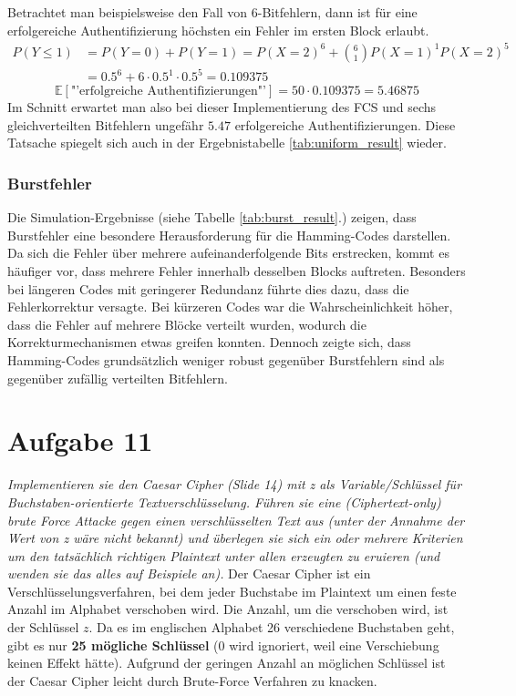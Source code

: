 \documentclass{article}
\begin{document}
    Betrachtet man beispielsweise den Fall von 6-Bitfehlern, dann ist für eine erfolgereiche Authentifizierung
    höchsten ein Fehler im ersten Block erlaubt.
    \begin{align*}
        P(Y \leq 1) &= P(Y = 0) + P(Y = 1) = P(X=2)^{6} + {6\choose 1}P(X=1)^1P(X=2)^{5}\\
        &=0.5^{6} + 6\cdot 0.5^1 \cdot 0.5^5 = 0.109375
    \end{align*}
    \[
        \mathbb{E}\left[\text{"'erfolgreiche Authentifizierungen"'}\right] =  50 \cdot 0.109375 = 5.46875
    \]
    Im Schnitt erwartet man also bei dieser Implementierung des FCS und sechs gleichverteilten Bitfehlern 
    ungefähr $5.47$ erfolgereiche Authentifizierungen. Diese Tatsache spiegelt sich auch in der Ergebnistabelle 
    \ref{tab:uniform_result} wieder.

    
    \subsubsection{Burstfehler}  
    Die Simulation-Ergebnisse (siehe Tabelle \ref{tab:burst_result}.) zeigen, dass Burstfehler eine besondere Herausforderung für die Hamming-Codes darstellen. 
    Da sich die Fehler über mehrere aufeinanderfolgende Bits erstrecken, kommt es häufiger vor, dass mehrere Fehler 
    innerhalb desselben Blocks auftreten. Besonders bei längeren Codes mit geringerer Redundanz führte dies dazu, 
    dass die Fehlerkorrektur versagte. Bei kürzeren Codes war die Wahrscheinlichkeit höher, dass die Fehler auf mehrere 
    Blöcke verteilt wurden, wodurch die Korrekturmechanismen etwas greifen konnten. Dennoch zeigte sich, 
    dass Hamming-Codes grundsätzlich weniger robust gegenüber Burstfehlern sind als gegenüber zufällig verteilten 
    Bitfehlern.
    
    \newpage
    \section{Aufgabe 11}
    \textit{Implementieren sie den Caesar Cipher (Slide 14) mit z als Variable/Schlüssel für
    Buchstaben-orientierte Textverschlüsselung. Führen sie eine (Ciphertext-only) brute
    Force Attacke gegen einen verschlüsselten Text aus (unter der Annahme der Wert
    von z wäre nicht bekannt) und überlegen sie sich ein oder mehrere Kriterien um den
    tatsächlich richtigen Plaintext unter allen erzeugten zu eruieren (und wenden sie das
    alles auf Beispiele an).}\vspace*{1em}\newline
    Der Caesar Cipher ist ein Verschlüsselungsverfahren, bei dem jeder Buchstabe im Plaintext um einen feste Anzahl
    im Alphabet verschoben wird. Die Anzahl, um die verschoben wird, ist der Schlüssel $z$. Da es im englischen Alphabet
    26 verschiedene Buchstaben geht, gibt es nur \textbf{25 mögliche Schlüssel} (0 wird ignoriert, weil eine Verschiebung 
    keinen Effekt hätte). Aufgrund der geringen Anzahl an möglichen Schlüssel ist der Caesar Cipher leicht durch Brute-Force 
    Verfahren zu knacken.
\end{document}
